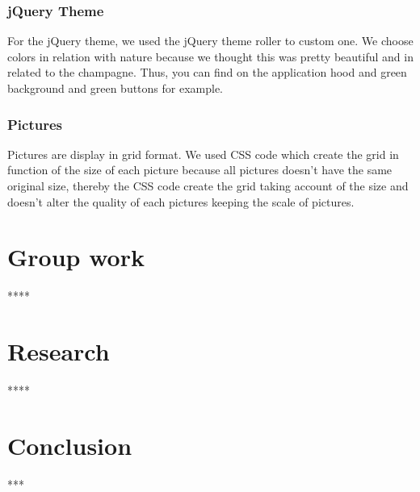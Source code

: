 \documentclass[12pt]{report}%
\begin{document}
\subsection{jQuery Theme}
For the jQuery theme, we used the jQuery theme roller to custom one. We choose colors in relation with nature because we thought this was pretty beautiful and in related to the champagne. Thus, you can find on the application hood and green background and green buttons for example.
\subsection{Pictures}
Pictures are display in grid format. We used CSS code which create the grid in function of the size of each picture because all pictures doesn't have the same original size, thereby the CSS code create the grid taking account of the size and doesn't alter the quality of each pictures keeping the scale of pictures.
\chapter{Group work}
****

\chapter{Research}
****

\chapter{Conclusion}
***

\clearpage
\end{document}
